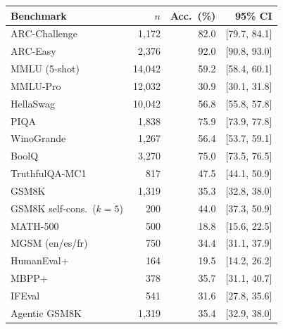 \begin{tabular}{lrrr}
\toprule
Benchmark & $n$ & Acc.\ (\%) & 95\% CI \\
\midrule
ARC-Challenge & 1,172 & 82.0 & [79.7, 84.1] \\
ARC-Easy & 2,376 & 92.0 & [90.8, 93.0] \\
MMLU (5-shot) & 14,042 & 59.2 & [58.4, 60.1] \\
MMLU-Pro & 12,032 & 30.9 & [30.1, 31.8] \\
HellaSwag & 10,042 & 56.8 & [55.8, 57.8] \\
PIQA & 1,838 & 75.9 & [73.9, 77.8] \\
WinoGrande & 1,267 & 56.4 & [53.7, 59.1] \\
BoolQ & 3,270 & 75.0 & [73.5, 76.5] \\
TruthfulQA-MC1 & 817 & 47.5 & [44.1, 50.9] \\
GSM8K & 1,319 & 35.3 & [32.8, 38.0] \\
GSM8K self-cons.\ ($k{=}5$) & 200 & 44.0 & [37.3, 50.9] \\
MATH-500 & 500 & 18.8 & [15.6, 22.5] \\
MGSM (en/es/fr) & 750 & 34.4 & [31.1, 37.9] \\
HumanEval+ & 164 & 19.5 & [14.2, 26.2] \\
MBPP+ & 378 & 35.7 & [31.1, 40.7] \\
IFEval & 541 & 31.6 & [27.8, 35.6] \\
Agentic GSM8K & 1,319 & 35.4 & [32.9, 38.0] \\
\bottomrule
\end{tabular}
